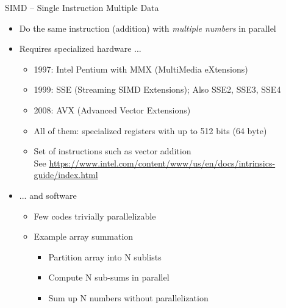 \begin{frame}{SIMD -- Single Instruction Multiple Data}
%
\begin{itemize}
\item Do the same instruction (\zB addition) with \emph{multiple numbers} in parallel
\item Requires specialized hardware ...
	\begin{itemize}
	\item 1997: Intel Pentium with MMX (MultiMedia eXtensions)
	\item 1999: SSE (Streaming SIMD Extensions); Also SSE2, SSE3, SSE4
	\item 2008: AVX (Advanced Vector Extensions)
	\item All of them: specialized registers with up to 512 bits (64 byte)
	\item Set of instructions such as vector addition\\
		See \url{https://www.intel.com/content/www/us/en/docs/intrinsics-guide/index.html}
	\end{itemize}
\item ... and software
	\begin{itemize}
	\item Few codes trivially parallelizable
	\item Example array summation
		\begin{itemize}
		\item Partition array into N sublists
		\item Compute N sub-sums in parallel
		\item Sum up N numbers without parallelization
		\end{itemize}
	\end{itemize}
\end{itemize}
%
\end{frame}


